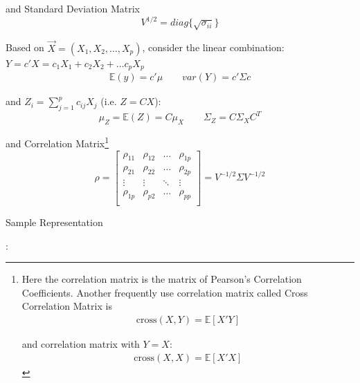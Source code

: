 \begin{itemize}[topsep=6pt,itemsep=4pt]
    and Standard Deviation Matrix
    \begin{equation}\label{EqaStandardDeviationMatrix}
        V^{1/2}=diag\{\sqrt{\sigma _{ii}}\} 
    \end{equation}

    Based on $ \vec{X}=(X_{1},X_{2},\ldots,X_{p})  $, consider the linear combination:$ Y=c'X=c_1X_1+c_2X_2+\ldots c_pX_p $
    \begin{align*}
        \mathbb{E}(y)=c'\mu\qquad var(Y)=c'\Sigma c
    \end{align*}

    and $ Z_i=\sum_{j=1}^p c_{ij}X_j $ (i.e. $ Z=CX $):
    \begin{equation}
        \mu_Z=\mathbb{E}(Z)= C\mu_X\qquad \Sigma _Z=C\Sigma _XC^T
    \end{equation}
    
    
    
    

    and Correlation Matrix\footnote{Here the correlation matrix is the matrix of Pearson's Correlation Coefficients. Another frequently use correlation matrix called Cross Correlation Matrix is 
    \begin{align*}
            \mathrm{cross}(X,Y)= \mathbb{E}\left[ X'Y \right]
    \end{align*}

    and correlation matrix with $ Y=X $:
    \begin{align*}
        \mathrm{cross}(X,X)=  \mathbb{E}\left[ X'X\right]
    \end{align*}
    }
    \begin{equation}
        \rho =\begin{bmatrix}
        \rho _{11}&\rho _{12}&\ldots&\rho _{1p}\\
        \rho _{21}&\rho _{22}&\ldots&\rho _{2p}\\
        \vdots&\vdots&\ddots&\vdots\\
        \rho _{1p}&\rho _{p2}&\ldots&\rho _{pp}\\
        \end{bmatrix} 
        =V^{-1/2}\Sigma V^{-1/2}
    \end{equation}
    
    
    \end{itemize}
    
        
\begin{point}
    \hypertarget{SampleRepresentation}{Sample Representation}:
\end{point}
    
